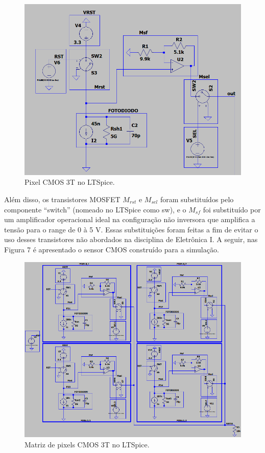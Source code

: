 \documentclass[10pt,a4paper,twocolumn]{article}
\begin{document}
	\begin{figure}[!h]
		\centering
		\includegraphics[scale=0.3]{imagens/pixel_simulado.png}
		\caption{Pixel CMOS 3T no LTSpice.}
	\end{figure}
	
	Além disso, os transistores MOSFET $M_{rst}$ e $M_{sel}$ foram substituídos pelo componente ``switch'' (nomeado no LTSpice como sw), e o $M_{sf}$ foi substituído por um amplificador operacional ideal na configuração não inversora que amplifica a tensão para o range de 0 à 5 V. Essas substituições foram feitas a fim de evitar o uso desses transistores não abordados na disciplina de Eletrônica I. A seguir, nas Figura 7 é apresentado o sensor CMOS construído para a simulação.
	
	\begin{figure}[h]
	\centering
	\includegraphics[scale=0.43]{imagens/matriz_simulada.png}
	\caption{Matriz de pixels CMOS 3T no LTSpice.}	
	\end{figure}
\end{document}
